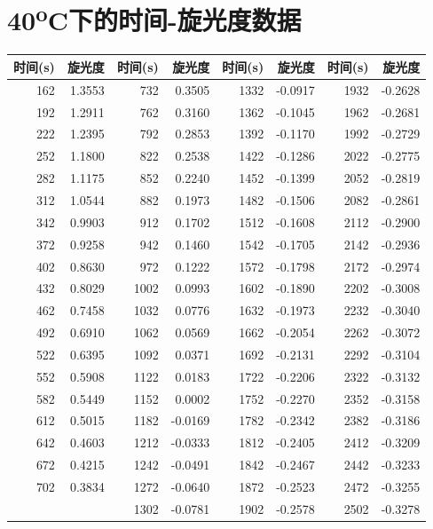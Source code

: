 \documentclass[11pt]{report}
\begin{document}
\section{40\textsuperscript{o}C下的时间-旋光度数据}
\label{sec:org7fb9288}
\begin{center}
\begin{tabular}{rrrrrrrr}
时间(s) & 旋光度 & 时间(s) & 旋光度 & 时间(s) & 旋光度 & 时间(s) & 旋光度\\
\hline
162 & 1.3553 & 732 & 0.3505 & 1332 & -0.0917 & 1932 & -0.2628\\
192 & 1.2911 & 762 & 0.3160 & 1362 & -0.1045 & 1962 & -0.2681\\
222 & 1.2395 & 792 & 0.2853 & 1392 & -0.1170 & 1992 & -0.2729\\
252 & 1.1800 & 822 & 0.2538 & 1422 & -0.1286 & 2022 & -0.2775\\
282 & 1.1175 & 852 & 0.2240 & 1452 & -0.1399 & 2052 & -0.2819\\
312 & 1.0544 & 882 & 0.1973 & 1482 & -0.1506 & 2082 & -0.2861\\
342 & 0.9903 & 912 & 0.1702 & 1512 & -0.1608 & 2112 & -0.2900\\
372 & 0.9258 & 942 & 0.1460 & 1542 & -0.1705 & 2142 & -0.2936\\
402 & 0.8630 & 972 & 0.1222 & 1572 & -0.1798 & 2172 & -0.2974\\
432 & 0.8029 & 1002 & 0.0993 & 1602 & -0.1890 & 2202 & -0.3008\\
462 & 0.7458 & 1032 & 0.0776 & 1632 & -0.1973 & 2232 & -0.3040\\
492 & 0.6910 & 1062 & 0.0569 & 1662 & -0.2054 & 2262 & -0.3072\\
522 & 0.6395 & 1092 & 0.0371 & 1692 & -0.2131 & 2292 & -0.3104\\
552 & 0.5908 & 1122 & 0.0183 & 1722 & -0.2206 & 2322 & -0.3132\\
582 & 0.5449 & 1152 & 0.0002 & 1752 & -0.2270 & 2352 & -0.3158\\
612 & 0.5015 & 1182 & -0.0169 & 1782 & -0.2342 & 2382 & -0.3186\\
642 & 0.4603 & 1212 & -0.0333 & 1812 & -0.2405 & 2412 & -0.3209\\
672 & 0.4215 & 1242 & -0.0491 & 1842 & -0.2467 & 2442 & -0.3233\\
702 & 0.3834 & 1272 & -0.0640 & 1872 & -0.2523 & 2472 & -0.3255\\
 &  & 1302 & -0.0781 & 1902 & -0.2578 & 2502 & -0.3278\\
\end{tabular}
\end{center}
\end{document}
